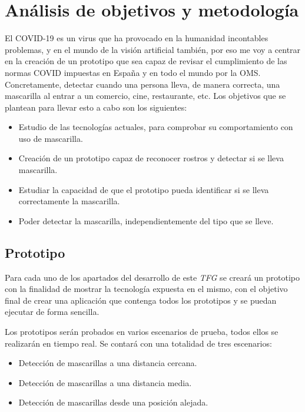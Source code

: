 
\lstset{frame=single,basicstyle=\ttfamily\small}

\chapter{Análisis de objetivos y metodología}

El COVID-19 es un virus que ha provocado en la humanidad incontables problemas, y en el mundo de la visión artificial también, por eso me voy a centrar en la creación de un prototipo que sea capaz de revisar el cumplimiento de las normas COVID impuestas en España y en todo el mundo por la OMS. Concretamente, detectar cuando una persona lleva, de manera correcta, una mascarilla al entrar a un comercio, cine, restaurante, etc. Los objetivos que se plantean para llevar esto a cabo son los siguientes:

\begin{itemize}
	\item Estudio de las tecnologías actuales, para comprobar su comportamiento con uso de mascarilla.
	\item Creación de un prototipo capaz de reconocer rostros y detectar si se lleva mascarilla.
	\item Estudiar la capacidad de que el prototipo pueda identificar si se lleva correctamente la mascarilla. 
	\item Poder detectar la mascarilla, independientemente del tipo que se lleve.
\end{itemize}

\section{Prototipo}

Para cada uno de los apartados del desarrollo de este \textit{TFG} se creará un prototipo con la finalidad de mostrar la tecnología expuesta en el mismo, con el objetivo final de crear una aplicación que contenga todos los prototipos y se puedan ejecutar de forma sencilla. 

Los prototipos serán probados en varios escenarios de prueba, todos ellos se realizarán en tiempo real. Se contará con una totalidad de tres escenarios:

\begin{itemize}
	\item Detección de mascarillas a una distancia cercana.
	\item Detección de mascarillas a una distancia media.
	\item Detección de mascarillas desde una posición alejada.
\end{itemize}

